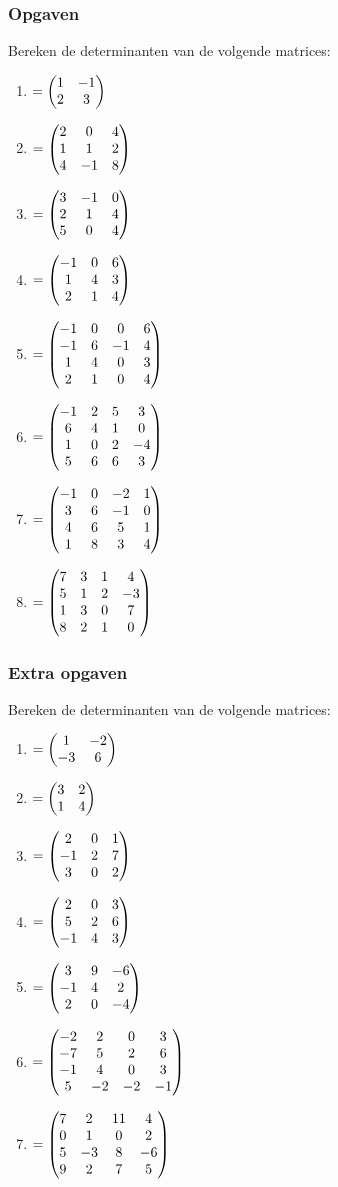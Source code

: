 \subsubsection{Opgaven}
Bereken de determinanten van de volgende matrices:\\
\begin{enumerate}[label=\Alph*]
	\item 
	$  = \begin{pmatrix} 1 & -1 \\  2 & 3 \end{pmatrix} $ \\
	\item 
	$  = \begin{pmatrix} 2 & 0 & 4 \\ 1 & 1 & 2 \\ 4 & -1 & 8 \end{pmatrix} $ \\
	\item 
	$  =  \begin{pmatrix} 3 & -1 & 0 \\ 2 & 1 & 4 \\ 5 & 0 & 4 \end{pmatrix} $ \\
	\item 
	$  =  \begin{pmatrix} -1 & 0 & 6 \\ 1 & 4 & 3 \\ 2 & 1 & 4 \end{pmatrix} $ \\ 
	\item 
	$   = \begin{pmatrix} -1 & 0 &  0 & 6 \\ -1 & 6 & -1 & 4 \\ 1 & 4 & 0 & 3 \\ 2 & 1 & 0 & 4 \end{pmatrix} $ \\
	\item 
	$  =  \begin{pmatrix} -1 & 2 &  5 & 3 \\ 6 & 4 & 1 & 0 \\ 1 & 0 & 2 & -4 \\ 5 & 6 & 6 & 3 \end{pmatrix} $ \\
	\item 
	$   = \begin{pmatrix} -1 & 0 &  -2 & 1 \\ 3 & 6 & -1 & 0 \\ 4 & 6 & 5 & 1 \\ 1 & 8 & 3 & 4 \end{pmatrix} $ \\
	\item 
	$  =  \begin{pmatrix} 7 & 3 &  1 & 4 \\ 5 & 1 & 2 & -3 \\ 1 & 3 & 0 & 7 \\ 8 & 2 & 1 & 0 \end{pmatrix} $
\end{enumerate}

\newpage
\subsubsection{Extra opgaven}
Bereken de determinanten van de volgende matrices:\\

\begin{enumerate}[label=\Alph*]
	\item 
	$   = \begin{pmatrix} 1 & -2 \\  -3 & 6 \end{pmatrix} $ \\ 
	\item 
	$  = \begin{pmatrix} 3 & 2  \\ 1 & 4  \end{pmatrix} $ \\
	\item 
	$ = \begin{pmatrix} 2 & 0 & 1 \\ -1 & 2 & 7 \\ 3 & 0 & 2 \end{pmatrix} $ \\
	\item  
	$  = \begin{pmatrix} 2 & 0 & 3 \\ 5 & 2 & 6 \\ -1 & 4 & 3 \end{pmatrix} $ \\  
	\item 
	$   = \begin{pmatrix} 3 & 9 &  -6  \\ -1 & 4 & 2  \\ 2 & 0 & -4  \end{pmatrix}
	$ \\
	\item 
	$  =  \begin{pmatrix} -2 & 2 &  0 & 3 \\ -7 & 5 & 2 & 6 \\ -1 & 4 & 0 & 3 \\ 5 & -2 & -2 & -1 \end{pmatrix} $ \\ 
	\item 
	$ = \begin{pmatrix} 7 & 2 &  11 & 4 \\ 0 & 1 & 0 & 2 \\ 5 & -3 & 8 & -6 \\ 9 & 2 & 7 & 5 \end{pmatrix} $
\end{enumerate}
